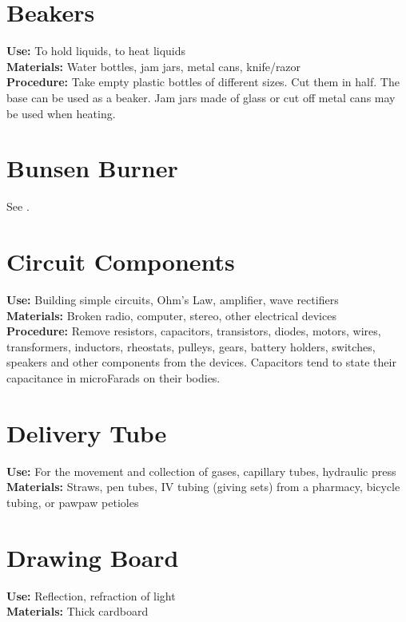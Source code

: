 \section{Beakers}
\vspace{-10pt}
\textbf{Use:} To hold liquids, to heat liquids\\
\textbf{Materials:} Water bottles, jam jars, metal cans, knife\slash razor\\
\textbf{Procedure:} Take empty plastic bottles of different sizes. Cut them in half. The base can be used as a beaker. Jam jars made of glass or cut off metal cans may be used when heating. 

\section{Bunsen Burner}
\vspace{-10pt}
See .

\section{Circuit Components}
\vspace{-10pt}
\textbf{Use:} Building simple circuits, Ohm's Law, amplifier, wave rectifiers\\
\textbf{Materials:} Broken radio, computer, stereo, other electrical devices\\
\textbf{Procedure:} Remove resistors, capacitors, transistors, diodes, motors, wires, transformers, inductors, rheostats, pulleys, gears, battery holders, switches, speakers and other components from the devices. Capacitors tend to state their capacitance in microFarads on their bodies.

\section{Delivery Tube}
\vspace{-10pt}
\textbf{Use:} For the movement and collection of gases, capillary tubes, hydraulic press\\
\textbf{Materials:} Straws, pen tubes, IV tubing (giving sets) from a pharmacy, bicycle tubing, or pawpaw petioles

\section{Drawing Board}
\vspace{-10pt}
\textbf{Use:} Reflection, refraction of light\\
\textbf{Materials:} Thick cardboard

